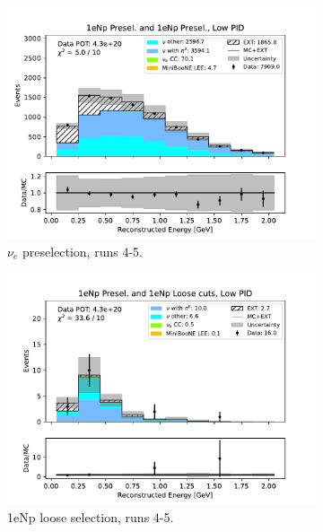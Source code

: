 \begin{figure}[H]
\begin{subfigure}{0.5\linewidth}
        \includegraphics[width=\linewidth]{technote/Sidebands/Figures/FarSideband/far_sideband_reco_e_run4b4c4d5_NP_NP_LOW_PID.pdf}
        \caption{$\nu_e$ preselection, runs 4-5.}
    \end{subfigure}%
    \begin{subfigure}{0.5\linewidth}
        \includegraphics[width=\linewidth]{technote/Sidebands/Figures/FarSideband/far_sideband_reco_e_run4b4c4d5_NP_NPL_LOW_PID.pdf}
        \caption{1eNp loose selection, runs 4-5.}
    \end{subfigure}    
    \begin{subfigure}{0.5\linewidth}

\end{subfigure}
\end{figure}
